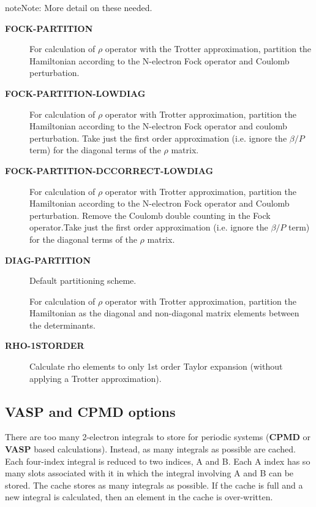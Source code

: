 \documentclass[openany,a4paper,10pt,english]{manual}
\begin{document}
\begin{notice}{note}{Note:}
More detail on these needed.
\end{notice}
\begin{description}
\item[\textbf{FOCK-PARTITION}] \leavevmode
For calculation of $\rho$ operator with the Trotter
approximation, partition the Hamiltonian according to the N-electron
Fock operator and Coulomb perturbation.

\item[\textbf{FOCK-PARTITION-LOWDIAG}] \leavevmode
For calculation of $\rho$ operator with Trotter approximation,
partition the Hamiltonian according to the N-electron Fock operator
and coulomb perturbation.  Take just the first order approximation
(i.e. ignore the $\beta/P$ term) for the diagonal terms of the
$\rho$ matrix.

\item[\textbf{FOCK-PARTITION-DCCORRECT-LOWDIAG}] \leavevmode
For calculation of $\rho$ operator with Trotter approximation,
partition the Hamiltonian according to the N-electron Fock operator
and Coulomb perturbation.  Remove the Coulomb double counting in the
Fock operator.Take just the first order approximation (i.e. ignore
the $\beta/P$ term) for the diagonal terms of the $\rho$
matrix.

\item[\textbf{DIAG-PARTITION}] \leavevmode
Default partitioning scheme.

For calculation of $\rho$ operator with Trotter approximation,
partition the Hamiltonian as the diagonal and non-diagonal matrix
elements between the determinants.

\item[\textbf{RHO-1STORDER}] \leavevmode
Calculate rho elements to only 1st order Taylor expansion (without
applying a Trotter approximation).

\end{description}


\subsection{VASP and CPMD options}

There are too many 2-electron integrals to store for periodic systems
(\textbf{CPMD} or \textbf{VASP} based calculations).  Instead, as many integrals as
possible are cached.  Each four-index integral is reduced to two indices,
A and B.  Each A index has so many slots associated with it in which
the integral involving A and B can be stored.  The cache stores
as many integrals as possible.  If the cache is full and a new integral
is calculated, then an element in the cache is over-written.
\end{document}
